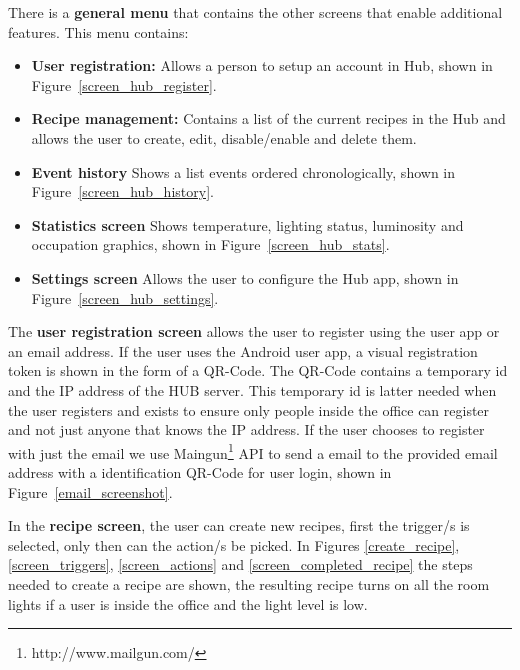 There is a \textbf{general menu} that contains the other screens that enable additional features. This menu contains:
\begin{itemize}
  \item \textbf{User registration:} Allows a person to setup an account in Hub, shown in Figure~\ref{screen_hub_register}. 
  \item \textbf{Recipe management:} Contains a list of the current recipes in the Hub and allows the user to create, edit, disable/enable and delete them.
  
  \item \textbf{Event history} Shows a list events ordered chronologically, shown in Figure~\ref{screen_hub_history}.  
  
  \item \textbf{Statistics screen} Shows temperature, lighting status, luminosity and occupation graphics, shown in Figure~\ref{screen_hub_stats}.   
  
  \item \textbf{Settings screen} Allows the user to configure the Hub app, shown in Figure~\ref{screen_hub_settings}.   
\end{itemize}



The \textbf{user registration screen} allows the user to register using the user app or an email address.
If the user uses the Android user app, a visual registration token is shown in the form of a QR-Code. The QR-Code contains a temporary id and the IP address of the HUB server. This temporary id is latter needed when the user registers and exists to ensure only people inside the office can register and not just anyone that knows the IP address. If the user chooses to register with just the email we use Maingun\footnote{http://www.mailgun.com/} API to send a email to the provided email address with a identification QR-Code for user login, shown in Figure~\ref{email_screenshot}.

In the \textbf{recipe screen}, the user can create new recipes, first the trigger/s is selected, only then can the action/s be picked. In Figures \ref{create_recipe}, \ref{screen_triggers}, \ref{screen_actions} and \ref{screen_completed_recipe} the steps needed to create a recipe are shown, the resulting recipe turns on all the room lights if a user is inside the office and the light level is low. 

